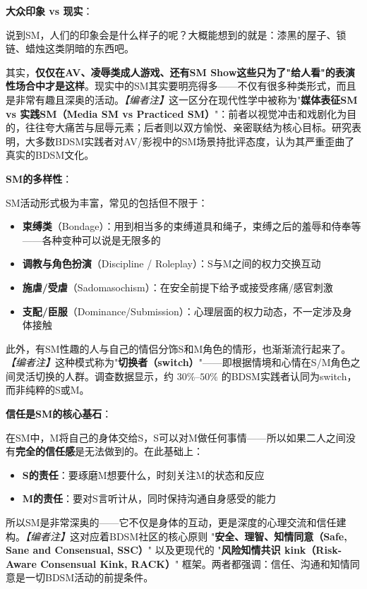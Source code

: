 \documentclass[12pt,UTF8]{ctexbook}
\begin{document}
\noindent\textbf{大众印象 vs 现实}：

说到SM，人们的印象会是什么样子的呢？大概能想到的就是：漆黑的屋子、锁链、蜡烛这类阴暗的东西吧。

其实，\textbf{仅仅在AV、凌辱类成人游戏、还有SM Show这些只为了"给人看"的表演性场合中才是这样}。现实中的SM其实要明亮得多——不仅有很多种类形式，而且是非常有趣且深奥的活动。\textit{【编者注】}这一区分在现代性学中被称为"\textbf{媒体表征SM vs 实践SM（Media SM vs Practiced SM）}"：前者以视觉冲击和戏剧化为目的，往往夸大痛苦与屈辱元素；后者则以双方愉悦、亲密联结为核心目标。研究表明，大多数BDSM实践者对AV/影视中的SM场景持批评态度，认为其严重歪曲了真实的BDSM文化。

\noindent\textbf{SM的多样性}：

SM活动形式极为丰富，常见的包括但不限于：

\begin{itemize}
	\item \textbf{束缚类}（Bondage）：用到相当多的束缚道具和绳子，束缚之后的羞辱和侍奉等——各种变种可以说是无限多的
	\item \textbf{调教与角色扮演}（Discipline / Roleplay）：S与M之间的权力交换互动
	\item \textbf{施虐/受虐}（Sadomasochism）：在安全前提下给予或接受疼痛/感官刺激
	\item \textbf{支配/臣服}（Dominance/Submission）：心理层面的权力动态，不一定涉及身体接触
\end{itemize}

此外，有SM性趣的人与自己的情侣分饰S和M角色的情形，也渐渐流行起来了。\textit{【编者注】}这种模式称为"\textbf{切换者（switch）}"——即根据情境和心情在S/M角色之间灵活切换的人群。调查数据显示，约 $30\%$--$50\%$ 的BDSM实践者认同为switch，而非纯粹的S或M。

\noindent\textbf{信任是SM的核心基石}：

在SM中，M将自己的身体交给S，S可以对M做任何事情——所以如果二人之间没有\textbf{完全的信任感}是无法做到的。在此基础上：
\begin{itemize}
	\item \textbf{S的责任}：要琢磨M想要什么，时刻关注M的状态和反应
	\item \textbf{M的责任}：要对S言听计从，同时保持沟通自身感受的能力
\end{itemize}

所以SM是非常深奥的——它不仅是身体的互动，更是深度的心理交流和信任建构。\textit{【编者注】}这对应着BDSM社区的核心原则 "\textbf{安全、理智、知情同意（Safe, Sane and Consensual, SSC）}" 以及更现代的 "\textbf{风险知情共识 kink（Risk-Aware Consensual Kink, RACK）}" 框架。两者都强调：信任、沟通和知情同意是一切BDSM活动的前提条件。
\end{document}
